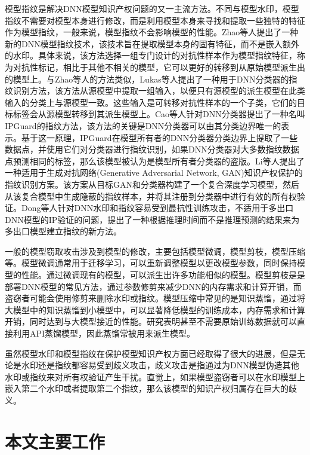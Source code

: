 模型指纹是解决DNN模型知识产权问题的又一主流方法。不同与模型水印，模型指纹不需要对模型本身进行修改，而是利用模型本身来寻找和提取一些独特的特征作为模型指纹，一般来说，模型指纹不会影响模型的性能。Zhao等人\cite{zhao2020afa}提出了一种新的DNN模型指纹技术，该技术旨在提取模型本身的固有特征，而不是嵌入额外的水印。具体来说，该方法选择一组专门设计的对抗性样本作为模型指纹特征，称为对抗性标记，相比于其他不相关的模型，它可以更好的转移到从原始模型派生出的模型上。与Zhao等人\cite{zhao2020afa}的方法类似，Lukas等人\cite{lukas2019deep}提出了一种用于DNN分类器的指纹识别方法，该方法从源模型中提取一组输入，以便只有源模型的派生模型在此类输入的分类上与源模型一致。这些输入是可转移对抗性样本的一个子类，它们的目标标签会从源模型转移到其派生模型上。Cao等人\cite{cao2021ipguard}针对DNN分类器提出了一种名叫IPGuard的指纹方法，该方法的关键是DNN分类器可以由其分类边界唯一的表示。基于这一原理，IPGuard在模型所有者的DNN分类器分类边界上提取了一些数据点，并使用它们对分类器进行指纹识别，如果DNN分类器对大多数指纹数据点预测相同的标签，那么该模型被认为是模型所有者分类器的盗版。Li等人\cite{li2021novel}提出了一种适用于生成对抗网络(Generative Adversarial Network, GAN)\cite{goodfellow2020generative}知识产权保护的指纹识别方案。该方案从目标GAN和分类器构建了一个复合深度学习模型，然后从该复合模型中生成隐蔽的指纹样本，并将其注册到分类器中进行有效的所有权验证。Dong等人\cite{dong2021fingerprinting}针对DNN水印和指纹容易受到最抗性训练攻击，不适用于多出口DNN模型的IP验证的问题，提出了一种根据推理时间而不是推理预测的结果来为多出口模型建立指纹的新方法。

一般的模型窃取攻击涉及到模型的修改，主要包括模型微调，模型剪枝，模型压缩等。模型微调通常用于迁移学习，可以重新调整模型以更改模型参数，同时保持模型的性能。通过微调现有的模型，可以派生出许多功能相似的模型。模型剪枝是是部署DNN模型的常见方法，通过参数修剪来减少DNN的内存需求和计算开销，而盗窃者可能会使用修剪来删除水印或指纹。模型压缩中常见的是知识蒸馏，通过将大模型中的知识蒸馏到小模型中，可以显著降低模型的训练成本，内存需求和计算开销，同时达到与大模型接近的性能。研究\cite{hinton2015distilling}表明甚至不需要原始训练数据就可以直接利用API蒸馏模型，因此蒸馏常被用来派生模型。

虽然模型水印和模型指纹在保护模型知识产权方面已经取得了很大的进展，但是无论是水印还是指纹都容易受到歧义攻击\cite{fan2019rethinking,li2019piracy}，歧义攻击是指通过为DNN模型伪造其他水印或指纹来对所有权验证产生干扰。直觉上，如果模型盗窃者可以在水印模型上嵌入第二个水印或者提取第二个指纹，那么该模型的知识产权归属存在巨大的歧义。

\section{本文主要工作}

